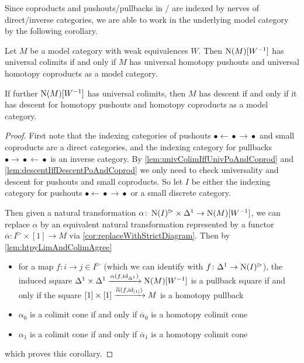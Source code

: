 Since coproducts and pushouts/pullbacks in \inftycats/ are indexed by nerves of direct/inverse categories, we are able to work in the underlying model category by the following corollary.
\begin{corollary}\label{cor:sufficientToProveInModCat}
    Let $M$ be a model category with weak equivalences $W$. 
    Then $\operatorname{N}(M)[W^{-1}]$ has universal colimits if and only if $M$ has universal homotopy pushouts and universal homotopy coproducts as a model category.
    
    If further $\operatorname{N}(M)[W^{-1}]$ has universal colimits, then $M$ has descent if and only if it has descent for homotopy pushouts and homotopy coproducts as a model category.
    \begin{proof}
        First note that the indexing categories of pushouts $\bullet\xleftarrow{}\bullet\xrightarrow{}\bullet$ and small coproducts are a direct categories, and the indexing category for pullbacks $\bullet\xrightarrow{}\bullet\xleftarrow{}\bullet$ is an inverse category.
        By \cref{lem:univColimIffUnivPoAndCoprod} and \cref{lem:descentIffDescentPoAndCoprod} we only need to check universality and descent for pushouts and small coproducts.
        So let $I$ be either the indexing category for pushouts $\bullet\xleftarrow{}\bullet\xrightarrow{}\bullet$ or a small discrete category.

        Then given a natural transformation $\alpha\colon\operatorname{N}(I)^{\rhd}\times\Delta^1\to\operatorname{N}(M)[W^{-1}]$, we can replace $\alpha$ by an equivalent natural transformation represented by a functor $\overline{\alpha}\colon I^{\rhd}\times[1]\to M$ via \cref{cor:replaceWithStrictDiagram}.
        Then by \cref{lem:htpyLimAndColimAgree}
        \begin{itemize}
            \item for a map $f\colon i\to j\in I^{\rhd}$ (which we can identify with $f\colon\Delta^1\to\operatorname{N}(I)^{\rhd}$), the induced square $\Delta^1\times\Delta^1\xrightarrow{\alpha(f,\text{id}_{\Delta^1})}\operatorname{N}(M)[W^{-1}]$ is a pullback square if and only if the square $[1]\times[1]\xrightarrow{\overline{\alpha}(f,\text{id}_{[1]})}M$ is a homotopy pullback
            \item $\alpha_0$ is a colimit cone if and only if $\overline{\alpha}_0$ is a homotopy colimit cone
            \item $\alpha_1$ is a colimit cone if and only if $\overline{\alpha}_1$ is a homotopy colimit cone
        \end{itemize}
        which proves this corollary.
    \end{proof}
\end{corollary}
